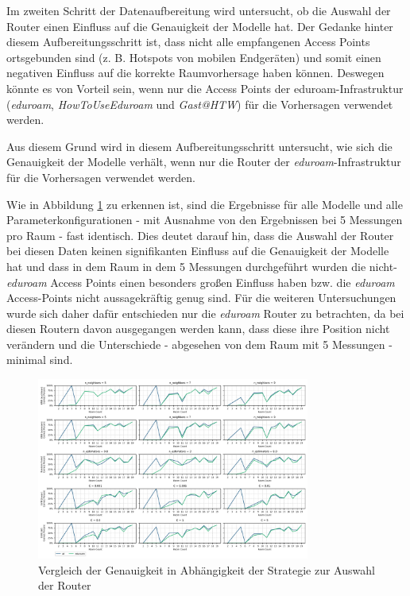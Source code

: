 Im zweiten Schritt der Datenaufbereitung wird untersucht, ob die Auswahl der Router einen Einfluss auf die Genauigkeit der Modelle hat. Der Gedanke hinter diesem Aufbereitungsschritt ist, dass nicht alle empfangenen Access Points ortsgebunden sind (z. B. Hotspots von mobilen Endgeräten) und somit einen negativen Einfluss auf die korrekte Raumvorhersage haben können. Deswegen könnte es von Vorteil sein, wenn nur die Access Points der eduroam-Infrastruktur (\textit{eduroam}, \textit{HowToUseEduroam} und \textit{Gast@HTW}) für die Vorhersagen verwendet werden.

Aus diesem Grund wird in diesem Aufbereitungsschritt untersucht, wie sich die Genauigkeit der Modelle verhält, wenn nur die Router der \textit{eduroam}-Infrastruktur für die Vorhersagen verwendet werden.

Wie in Abbildung \ref{fig:07_router_selection_02} zu erkennen ist, sind die Ergebnisse für alle Modelle und alle Parameterkonfigurationen - mit Ausnahme von den Ergebnissen bei 5 Messungen pro Raum - fast identisch. Dies deutet darauf hin, dass die Auswahl der Router bei diesen Daten keinen signifikanten Einfluss auf die Genauigkeit der Modelle hat und dass in dem Raum in dem 5 Messungen durchgeführt wurden die nicht-\textit{eduroam} Access Points einen besonders großen Einfluss haben bzw. die \textit{eduroam} Access-Points nicht aussagekräftig genug sind. Für die weiteren Untersuchungen wurde sich daher dafür entschieden nur die \textit{eduroam} Router zu betrachten, da bei diesen Routern davon ausgegangen werden kann, dass diese ihre Position nicht verändern und die Unterschiede - abgesehen von dem Raum mit 5 Messungen - minimal sind.

\begin{figure}[H]
    \centering
    \includegraphics[width=0.8\textwidth]{images/07_router_selection_02.png}
    \caption{Vergleich der Genauigkeit in Abhängigkeit der Strategie zur Auswahl der Router}
    \label{fig:07_router_selection_02}
\end{figure}

